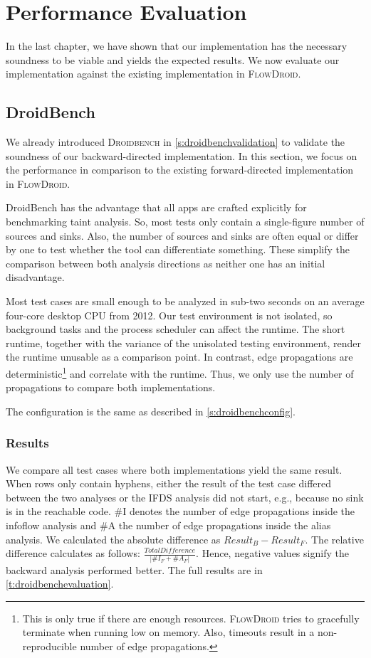 \documentclass[../draft.tex]{subfiles}
\begin{document}
    \chapter{Performance Evaluation}
    In the last chapter, we have shown that our implementation has the necessary soundness to be viable and yields the expected results. 
    We now evaluate our implementation against the existing implementation in \textsc{FlowDroid}.
    
    \section{DroidBench}
    We already introduced \textsc{Droidbench} in \autoref{s:droidbenchvalidation} to validate the soundness of our backward-directed implementation. 
    In this section, we focus on the performance in comparison to the existing forward-directed implementation in \textsc{FlowDroid}. 

    DroidBench has the advantage that all apps are crafted explicitly for benchmarking taint analysis. 
    So, most tests only contain a single-figure number of sources and sinks. 
    Also, the number of sources and sinks are often equal or differ by one to test whether the tool can differentiate something. 
    These simplify the comparison between both analysis directions as neither one has an initial disadvantage.

    Most test cases are small enough to be analyzed in sub-two seconds on an average four-core desktop CPU from 2012. 
    Our test environment is not isolated, so background tasks and the process scheduler can affect the runtime. 
    The short runtime, together with the variance of the unisolated testing environment, render the runtime unusable as a comparison point. 
    In contrast, edge propagations are deterministic\footnote{This is only true if there are enough resources. \textsc{FlowDroid} tries to gracefully terminate when running low on memory. Also, timeouts result in a non-reproducible number of edge propagations.} and correlate with the runtime. 
    Thus, we only use the number of propagations to compare both implementations.

    The configuration is the same as described in \autoref{s:droidbenchconfig}.

    \subsection{Results}
    We compare all test cases where both implementations yield the same result. 
    When rows only contain hyphens, either the result of the test case differed between the two analyses or the IFDS analysis did not start, e.g., because no sink is in the reachable code. 
    \#I denotes the number of edge propagations inside the infoflow analysis and \#A the number of edge propagations inside the alias analysis. 
    We calculated the absolute difference as $\mathit{Result}_{\mathit{B}} - \mathit{Result}_{\mathit{F}}$. 
    The relative difference calculates as follows: $\frac{\mathit{TotalDifference}}{|\mathit{\#I_\mathit{F} + \#A_\mathit{F}}|}$. 
    Hence, negative values signify the backward analysis performed better. 
    The full results are in \autoref{t:droidbenchevaluation}.
\end{document}

